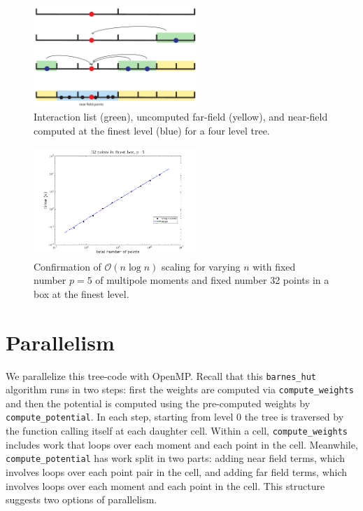\documentclass{article}
\renewcommand{\O}{\mathcal{O}}
\begin{document}
\begin{figure}
  \centering
  \includegraphics[width=0.55\textwidth]{./figures/interaction_list.pdf}
  \caption{Interaction list (green), uncomputed far-field (yellow), and near-field computed at the finest level (blue) for a four level tree.}
  \label{fig:interaction}
\end{figure}

\begin{figure}
  \centering
  \includegraphics[width=0.55\textwidth]{./figures/varying_n_m32_p5.png}
  \caption{Confirmation of $\O(n\log n)$ scaling for varying $n$ with fixed number $p=5$ of multipole moments and fixed number 32 points in a box at the finest level.}
  \label{fig:scaling}
\end{figure}


\section{Parallelism}
We parallelize this tree-code with OpenMP. Recall that this {\tt barnes\_hut} algorithm runs in two steps: first the weights are computed via {\tt compute\_weights} and then the potential is computed using the pre-computed weights by {\tt compute\_potential}. In each step, starting from level 0 the tree is traversed by the function calling itself at each daughter cell. Within a cell, {\tt compute\_weights} includes work that loops over each moment and each point in the cell. Meanwhile, {\tt compute\_potential} has work split in two parts: adding near field terms, which involves loops over each point pair in the cell, and adding far field terms, which involves loops over each moment and each point in the cell. This structure suggests two options of parallelism.
\end{document}

